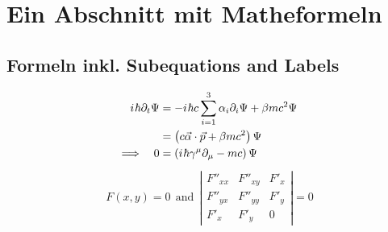 
\section{Ein Abschnitt mit Matheformeln}
\blindmathpaper


\subsection{Formeln inkl. Subequations and Labels}
\label{sec:maths-incl-subeq}
\blindtext
\newcommand{\iu}{{i\mkern1mu}}
\vspace{-.4cm}
\begin{subequations}
  \begin{align}
    \iu \hbar \partial_t \Psi &= - \iu \hbar c \sum_{i=1}^3 \alpha_i \partial_i \Psi + \beta m c^2 \Psi\\ &= \left( c \vec \alpha \cdot \vec p + \beta m c^2 \right) \Psi \\
    \Longrightarrow \quad 0 &= \left( \iu \hbar \gamma^\mu \partial_\mu - mc \right) \Psi
  \end{align}
\end{subequations}
\blindtext
\begin{align}
  F(x,y)=0 ~~\mbox{and}~~
  \left| \begin{array}{ccc}
           F''_{xx} & F''_{xy} &  F'_x \\
           F''_{yx} & F''_{yy} &  F'_y \\
           F'_x     & F'_y     & 0
         \end{array}\right| = 0
\label{eq:1}
\end{align}
\blindtext


